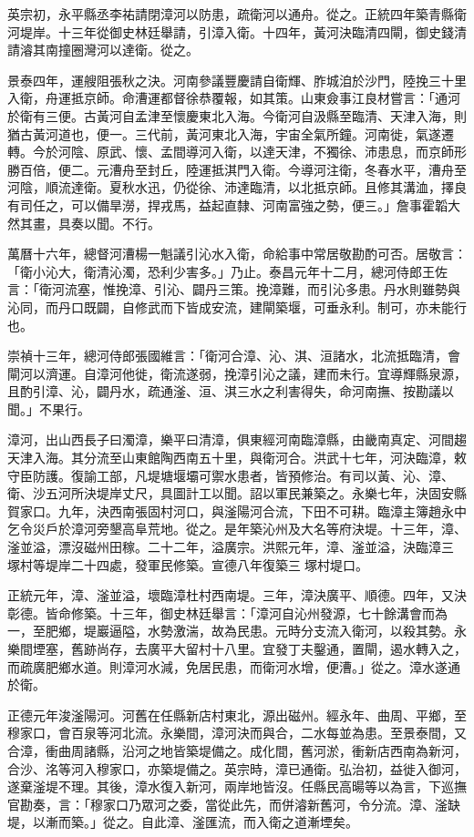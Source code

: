 英宗初，永平縣丞李祐請閉漳河以防患，疏衛河以通舟。從之。正統四年築青縣衛河堤岸。十三年從御史林廷舉請，引漳入衛。十四年，黃河決臨清四閘，御史錢清請濬其南撞圈灣河以達衛。從之。

景泰四年，運艘阻張秋之決。河南參議豐慶請自衛輝、胙城洎於沙門，陸挽三十里入衛，舟運抵京師。命漕運都督徐恭覆報，如其策。山東僉事江良材嘗言：「通河於衛有三便。古黃河自孟津至懷慶東北入海。今衛河自汲縣至臨清、天津入海，則猶古黃河道也，便一。三代前，黃河東北入海，宇宙全氣所鐘。河南徙，氣遂遷轉。今於河陰、原武、懷、孟間導河入衛，以達天津，不獨徐、沛患息，而京師形勝百倍，便二。元漕舟至封丘，陸運抵淇門入衛。今導河注衛，冬春水平，漕舟至河陰，順流達衛。夏秋水迅，仍從徐、沛達臨清，以北抵京師。且修其溝洫，擇良有司任之，可以備旱澇，捍戎馬，益起直隸、河南富強之勢，便三。」詹事霍韜大然其畫，具奏以聞。不行。

萬曆十六年，總督河漕楊一魁議引沁水入衛，命給事中常居敬勘酌可否。居敬言：「衛小沁大，衛清沁濁，恐利少害多。」乃止。泰昌元年十二月，總河侍郎王佐言：「衛河流塞，惟挽漳、引沁、闢丹三策。挽漳難，而引沁多患。丹水則雖勢與沁同，而丹口既闢，自修武而下皆成安流，建閘築堰，可垂永利。制可，亦未能行也。

崇禎十三年，總河侍郎張國維言：「衛河合漳、沁、淇、洹諸水，北流抵臨清，會閘河以濟運。自漳河他徙，衛流遂弱，挽漳引沁之議，建而未行。宜導輝縣泉源，且酌引漳、沁，闢丹水，疏通滏、洹、淇三水之利害得失，命河南撫、按勘議以聞。」不果行。

漳河，出山西長子曰濁漳，樂平曰清漳，俱東經河南臨漳縣，由畿南真定、河間趨天津入海。其分流至山東館陶西南五十里，與衛河合。洪武十七年，河決臨漳，敕守臣防護。復諭工部，凡堤塘堰壩可禦水患者，皆預修治。有司以黃、沁、漳、衛、沙五河所決堤岸丈尺，具圖計工以聞。詔以軍民兼築之。永樂七年，決固安縣賀家口。九年，決西南張固村河口，與滏陽河合流，下田不可耕。臨漳主簿趙永中乞令災戶於漳河旁墾高阜荒地。從之。是年築沁州及大名等府決堤。十三年，漳、滏並溢，漂沒磁州田稼。二十二年，溢廣宗。洪熙元年，漳、滏並溢，決臨漳三塚村等堤岸二十四處，發軍民修築。宣德八年復築三塚村堤口。

正統元年，漳、滏並溢，壞臨漳杜村西南堤。三年，漳決廣平、順德。四年，又決彰德。皆命修築。十三年，御史林廷舉言：「漳河自沁州發源，七十餘溝會而為一，至肥鄉，堤巖逼隘，水勢激湍，故為民患。元時分支流入衛河，以殺其勢。永樂間堙塞，舊跡尚存，去廣平大留村十八里。宜發丁夫鑿通，置閘，遏水轉入之，而疏廣肥鄉水道。則漳河水減，免居民患，而衛河水增，便漕。」從之。漳水遂通於衛。

正德元年浚滏陽河。河舊在任縣新店村東北，源出磁州。經永年、曲周、平鄉，至穆家口，會百泉等河北流。永樂間，漳河決而與合，二水每並為患。至景泰間，又合漳，衝曲周諸縣，沿河之地皆築堤備之。成化間，舊河淤，衝新店西南為新河，合沙、洺等河入穆家口，亦築堤備之。英宗時，漳已通衛。弘治初，益徙入御河，遂棄滏堤不理。其後，漳水復入新河，兩岸地皆沒。任縣民高暘等以為言，下巡撫官勘奏，言：「穆家口乃眾河之委，當從此先，而併濬新舊河，令分流。漳、滏缺堤，以漸而築。」從之。自此漳、滏匯流，而入衛之道漸堙矣。

